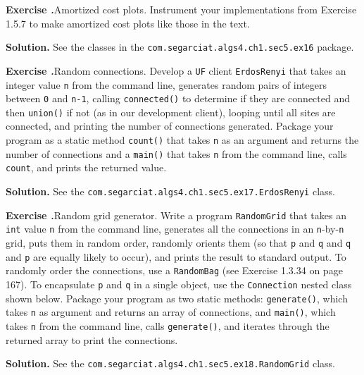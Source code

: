 \documentclass[12pt, a4paper]{article}
\newenvironment{ex}[2][Exercise]
{\par\medskip\noindent \textbf{#1 #2.}}
{\medskip}
\newenvironment{sol}[1][Solution]
{\par\medskip\noindent \textbf{#1.} }
{\medskip}
\begin{document}
	\begin{ex}{16}
		\emph{Amortized cost plots}. Instrument your implementations from Exercise 1.5.7
		to make amortized cost plots like those in the text.
	\end{ex}
	\begin{sol}
		See the classes in the \texttt{com.segarciat.algs4.ch1.sec5.ex16} package.
	\end{sol}
	\begin{ex}{17}
		\emph{Random connections}. Develop a \texttt{UF} client \texttt{ErdosRenyi} that
		takes an  integer value \texttt{n} from the command line, generates random pairs of
		integers between \texttt{0} and \texttt{n-1}, calling \texttt{connected()} to
		determine if they are connected and then \texttt{union()} if not (as in our
		development client), looping until all sites are connected, and printing the number
		of connections generated. Package your program as a static method \texttt{count()}
		that takes \texttt{n} as an argument and returns the number of connections and
		a \texttt{main()} that takes \texttt{n} from the command line, calls \texttt{count},
		and prints the returned value.
	\end{ex}
	\begin{sol}
		See the \texttt{com.segarciat.algs4.ch1.sec5.ex17.ErdosRenyi} class.
	\end{sol}
	\begin{ex}{18}
		\emph{Random grid generator}. Write a program \texttt{RandomGrid} that takes an
		\texttt{int} value \texttt{n} from the command line, generates all the connections
		in an \texttt{n}-by-\texttt{n} grid, puts them in random order, randomly orients them
		(so that \texttt{p} and \texttt{q} and \texttt{q} and \texttt{p} are equally likely to
		occur), and prints the result to standard output. To randomly order the connections,
		use a \texttt{RandomBag} (see Exercise 1.3.34 on page 167). To encapsulate
		\texttt{p} and \texttt{q} in a single object, use the \texttt{Connection} nested class
		shown below. Package your program as two static methods: \texttt{generate()}, which takes
		\texttt{n} as argument and returns an array of connections, and \texttt{main()}, which takes
		\texttt{n} from the command line, calls \texttt{generate()}, and iterates through the
		returned array to print the connections.
	\end{ex}
	\begin{sol}
		See the \texttt{com.segarciat.algs4.ch1.sec5.ex18.RandomGrid} class.
	\end{sol}
\end{document}
